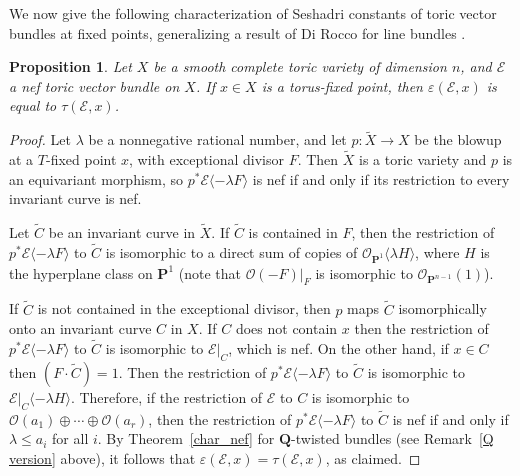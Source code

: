 \documentclass[12pt]{amsart}
\newtheorem{proposition}[lemma]{Proposition}
\theoremstyle{definition}
\theoremstyle{remark}
\begin{document}
We now give the following characterization of Seshadri constants of toric
vector bundles at fixed points, generalizing a result of Di Rocco for line bundles \cite{DR}.

\begin{proposition}\label{Seshadri}
Let $X$ be a smooth complete toric variety of dimension $n$, and ${\mathcal{E}}$ a nef toric vector bundle on $X$.
If $x\in X$ is a torus-fixed point, then ${\varepsilon}({\mathcal{E}},x)$ is equal to $\tau({\mathcal{E}},x)$.
\end{proposition}

\begin{proof}
Let $\lambda$ be a nonnegative rational number, and let $p\colon\widetilde X \rightarrow X$ be the blowup at a $T$-fixed point $x$, with exceptional divisor $F$.  Then $\widetilde X$ is a toric variety and $p$ is an equivariant morphism, so $p^* {\mathcal{E}} {\langle} -\lambda F {\rangle}$ is nef if and only if its restriction to every invariant curve is nef.

Let $\widetilde C$ be an invariant curve in $\widetilde X$.  If $\widetilde C$ is contained in $F$, then the restriction of $p^* {\mathcal{E}} {\langle} -\lambda F {\rangle}$ to 
$\widetilde{C}$ is isomorphic to a direct sum of copies of ${\mathcal{O}}_{{{\mathbf P}}^1}{\langle} \lambda H{\rangle}$, where $H$ is the hyperplane class on ${{\mathbf P}}^1$ (note that ${\mathcal{O}}(-F)\vert_F$ is isomorphic to ${\mathcal{O}}_{{{\mathbf P}}^{n-1}}(1)$).

If $\widetilde C$ is not contained in the exceptional divisor, then $p$ maps $\widetilde C$ isomorphically onto an invariant curve $C$ in $X$.  If $C$ does not contain $x$ then the restriction of $p^* {\mathcal{E}} {\langle} -\lambda F {\rangle}$ to $\widetilde C$ is isomorphic to ${\mathcal{E}}\vert_C$, which is nef.  On the other hand, if $x \in C$ then $(F \cdot \widetilde C) = 1$.  Then the restriction of $p^* {\mathcal{E}} {\langle} -\lambda F {\rangle}$ to $\widetilde C$ is isomorphic to ${\mathcal{E}}\vert_C {\langle} -\lambda H {\rangle}$.  Therefore, if the restriction of ${\mathcal{E}}$ to $C$ is isomorphic to ${\mathcal{O}}(a_1) \oplus \cdots\oplus{\mathcal{O}}(a_r)$, then the restriction of $p^* {\mathcal{E}} {\langle} -\lambda F {\rangle}$ to
$\widetilde{C}$ is nef if and only if $\lambda \leq a_i$ for all $i$.  By Theorem~\ref{char_nef} for ${{\mathbf Q}}$-twisted bundles (see Remark~\ref{Q version} above), it follows that ${\varepsilon}({\mathcal{E}},x) = \tau({\mathcal{E}},x)$, as claimed.
\end{proof}
\end{document}

